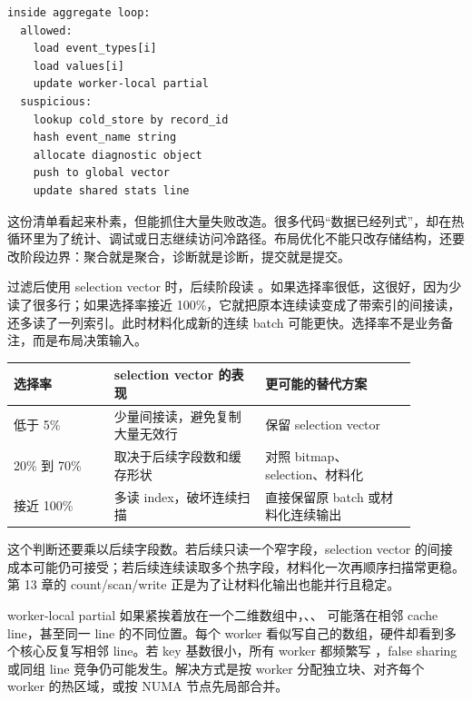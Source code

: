 \begin{lstlisting}[numbers=none,caption={热路径审计的最小清单}]
inside aggregate loop:
  allowed:
    load event_types[i]
    load values[i]
    update worker-local partial
  suspicious:
    lookup cold_store by record_id
    hash event_name string
    allocate diagnostic object
    push to global vector
    update shared stats line
\end{lstlisting}

这份清单看起来朴素，但能抓住大量失败改造。很多代码“数据已经列式”，却在热循环里为了统计、调试或日志继续访问冷路径。布局优化不能只改存储结构，还要改阶段边界：聚合就是聚合，诊断就是诊断，提交就是提交。

过滤后使用 selection vector 时，后续阶段读 。如果选择率很低，这很好，因为少读了很多行；如果选择率接近 100\%，它就把原本连续读变成了带索引的间接读，还多读了一列索引。此时材料化成新的连续 batch 可能更快。选择率不是业务备注，而是布局决策输入。

\begin{center}
\begin{tabular}{p{0.22\linewidth}p{0.33\linewidth}p{0.33\linewidth}}
\toprule
选择率 & selection vector 的表现 & 更可能的替代方案 \\
\midrule
低于 5\% & 少量间接读，避免复制大量无效行 & 保留 selection vector \\
20\% 到 70\% & 取决于后续字段数和缓存形状 & 对照 bitmap、selection、材料化 \\
接近 100\% & 多读 index，破坏连续扫描 & 直接保留原 batch 或材料化连续输出 \\
\bottomrule
\end{tabular}
\end{center}

这个判断还要乘以后续字段数。若后续只读一个窄字段，selection vector 的间接成本可能仍可接受；若后续连续读取多个热字段，材料化一次再顺序扫描常更稳。第 13 章的 count/scan/write 正是为了让材料化输出也能并行且稳定。

worker-local partial 如果紧挨着放在一个二维数组中，、、 可能落在相邻 cache line，甚至同一 line 的不同位置。每个 worker 看似写自己的数组，硬件却看到多个核心反复写相邻 line。若 key 基数很小，所有 worker 都频繁写 ，false sharing 或同组 line 竞争仍可能发生。解决方式是按 worker 分配独立块、对齐每个 worker 的热区域，或按 NUMA 节点先局部合并。

